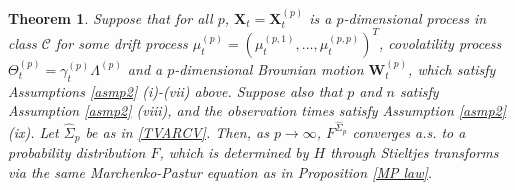 \documentclass[a4paper,11pt]{article}
\theoremstyle{plain}
\newtheorem{thm}{Theorem}[part]%
\theoremstyle{definition}
\begin{document}
    \begin{thm} \label{Thm 2}
    	Suppose that for all $p$, $\mathbf{X}_t = \mathbf{X}_t^{(p)}$ is a $p$-dimensional process in class $\mathcal{C}$ for some drift process $\mu_t^{(p)} = (\mu_t^{(p, 1)}, \dots , \mu_t^{(p, p)})^T$, covolatility process $\Theta_t^{(p)} = \gamma_t^{(p)} \Lambda^{(p)}$ and a $p$-dimensional Brownian motion $\mathbf{W}_t^{(p)}$, which satisfy Assumptions \ref{asmp2} (i)-(vii) above. Suppose also that $p$ and $n$ satisfy Assumption \ref{asmp2} (viii), and the observation times satisfy Assumption \ref{asmp2}(ix). Let $\hat{\Sigma}_p$ be as in \eqref{TVARCV}. Then, as $p \rightarrow \infty$, $F^{\hat{\Sigma}_p}$ converges a.s. to a probability distribution $F$, which is determined by $H$ through Stieltjes transforms via the same Marchenko-Pastur equation as in Proposition \ref{MP law}.
    \end{thm}
\end{document}
